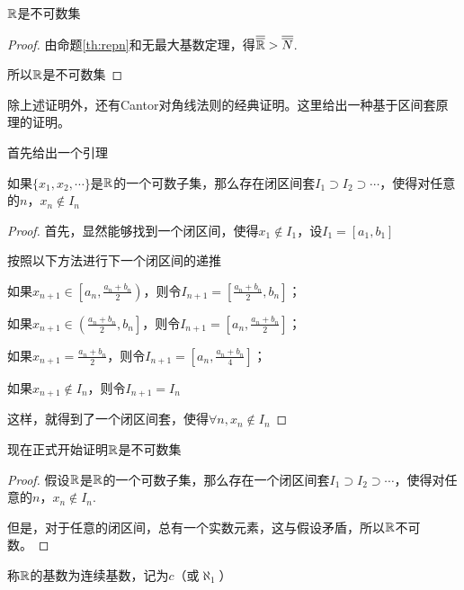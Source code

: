 \begin{theorem}
    $\mathbb{R}$是不可数集
\end{theorem}

\begin{proof}
    由命题\ref{th:repn}和无最大基数定理，得$\overline{\overline{\mathbb{R}}}>\overline{\overline{N}}$.

    所以$\mathbb{R}$是不可数集
\end{proof}

除上述证明外，还有Cantor对角线法则的经典证明。这里给出一种基于区间套原理的证明。

首先给出一个引理

\begin{lemma}
    如果$\{x_1,x_2,\cdots \}$是$\mathbb{R}$的一个可数子集，那么存在闭区间套$I_1\supset I_2\supset \cdots$，使得对任意的$n$，$x_n \notin I_n$
\end{lemma}

\begin{proof}
    首先，显然能够找到一个闭区间，使得$x_1\notin I_1$，设$I_1=[a_1,b_1]$

    按照以下方法进行下一个闭区间的递推

    如果$\displaystyle x_{n+1}\in\left[a_n,\frac{a_n+b_n}{2}\right)$，则令$I_{n+1} = \displaystyle\left[\frac{a_n+b_n}{2},b_n\right]$；

    如果$\displaystyle x_{n+1}\in\left(\frac{a_n+b_n}{2},b_n\right]$，则令$\displaystyle I_{n+1} = \left[a_n,\frac{a_n+b_n}{2}\right]$；

    如果$\displaystyle x_{n+1}=\frac{a_n+b_n}{2}$，则令$\displaystyle I_{n+1} = \left[a_n,\frac{a_n+b_n}{4}\right]$；

    如果$x_{n+1}\notin I_n$，则令$I_{n+1}=I_n$

    这样，就得到了一个闭区间套，使得$\forall n,x_n\notin I_n$

    \qde
\end{proof}

现在正式开始证明$\mathbb{R}$是不可数集

\begin{proof}
    假设$\mathbb{R}$是$\mathbb{R}$的一个可数子集，那么存在一个闭区间套$I_1\supset I_2\supset \cdots$，使得对任意的$n$，$x_n \notin I_n$.

    但是，对于任意的闭区间，总有一个实数元素，这与假设矛盾，所以$\mathbb{R}$不可数。

    \qde
\end{proof}

\begin{definition}
    称$\mathbb{R}$的基数为连续基数，记为$c$（或$\aleph_1$）
\end{definition}

